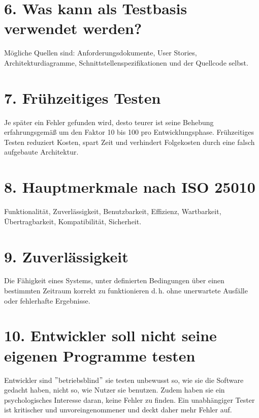 \documentclass[
	fontsize=12pt,          %
	paper=a4,               %
	numbers=noenddot,       %
	listof=totoc,           %
	listof=entryprefix,     %
	listof=nochaptergap,    %
	bibliography=totoc,     %
	parskip=half,           %
	openany                 %
]{scrbook}
\begin{document}
\section*{6. Was kann als Testbasis verwendet werden?}
Mögliche Quellen sind: Anforderungsdokumente, User Stories, Architekturdiagramme, Schnittstellenspezifikationen und der Quellcode selbst.


\section*{7. Frühzeitiges Testen}
Je später ein Fehler gefunden wird, desto teurer ist seine Behebung erfahrungsgemäß um den Faktor 10 bis 100 pro Entwicklungsphase.
Frühzeitiges Testen reduziert Kosten, spart Zeit und verhindert Folgekosten durch eine falsch aufgebaute Architektur.


\section*{8. Hauptmerkmale nach ISO 25010}
Funktionalität, Zuverlässigkeit, Benutzbarkeit, Effizienz, Wartbarkeit, Übertragbarkeit, Kompatibilität, Sicherheit.


\section*{9. Zuverlässigkeit}
Die Fähigkeit eines Systems, unter definierten Bedingungen über einen bestimmten Zeitraum korrekt zu funktionieren d.\,h. ohne unerwartete Ausfälle oder fehlerhafte Ergebnisse.


\section*{10. Entwickler soll nicht seine eigenen Programme testen}
Entwickler sind \("\)betriebsblind\("\) sie testen unbewusst so, wie sie die Software gedacht haben, nicht so, wie Nutzer sie benutzen.
Zudem haben sie ein psychologisches Interesse daran, keine Fehler zu finden.
Ein unabhängiger Tester ist kritischer und unvoreingenommener und deckt daher mehr Fehler auf.


\end{document}
